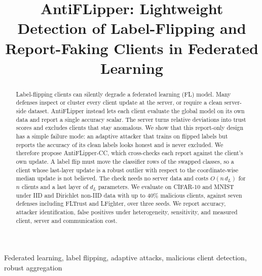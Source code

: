 \documentclass[conference]{IEEEtran}
\begin{document}
\title{AntiFLipper: Lightweight Detection of Label-Flipping and Report-Faking Clients in Federated Learning}

\author{
}

\maketitle

\begin{abstract}
Label-flipping clients can silently degrade a federated learning (FL) model. Many defenses inspect or cluster every client update at the server, or require a clean server-side dataset. AntiFLipper instead lets each client evaluate the global model on its own data and report a single accuracy scalar. The server turns relative deviations into trust scores and excludes clients that stay anomalous. We show that this report-only design has a simple failure mode: an adaptive attacker that trains on flipped labels but reports the accuracy of its clean labels looks honest and is never excluded. We therefore propose AntiFLipper-CC, which cross-checks each report against the client's own update. A label flip must move the classifier rows of the swapped classes, so a client whose last-layer update is a robust outlier with respect to the coordinate-wise median update is not believed. The check needs no server data and costs $O(n\,d_L)$ for $n$ clients and a last layer of $d_L$ parameters. We evaluate on CIFAR-10 and MNIST under IID and Dirichlet non-IID data with up to 40\% malicious clients, against seven defenses including FLTrust and LFighter, over three seeds. We report accuracy, attacker identification, false positives under heterogeneity, sensitivity, and measured client, server and communication cost.
\end{abstract}

\begin{IEEEkeywords}
Federated learning, label flipping, adaptive attacks, malicious client detection, robust aggregation
\end{IEEEkeywords}
\end{document}

